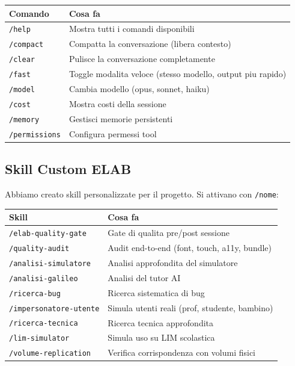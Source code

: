 \documentclass[11pt,a4paper]{article}
\begin{document}
\begin{tabularx}{\textwidth}{lX}
\toprule
\textbf{Comando} & \textbf{Cosa fa} \\
\midrule
\texttt{/help} & Mostra tutti i comandi disponibili \\
\texttt{/compact} & Compatta la conversazione (libera contesto) \\
\texttt{/clear} & Pulisce la conversazione completamente \\
\texttt{/fast} & Toggle modalita veloce (stesso modello, output piu rapido) \\
\texttt{/model} & Cambia modello (opus, sonnet, haiku) \\
\texttt{/cost} & Mostra costi della sessione \\
\texttt{/memory} & Gestisci memorie persistenti \\
\texttt{/permissions} & Configura permessi tool \\
\bottomrule
\end{tabularx}

\subsection{Skill Custom ELAB}

Abbiamo creato skill personalizzate per il progetto. Si attivano con \texttt{/nome}:

\begin{tabularx}{\textwidth}{lX}
\toprule
\textbf{Skill} & \textbf{Cosa fa} \\
\midrule
\texttt{/elab-quality-gate} & Gate di qualita pre/post sessione \\
\texttt{/quality-audit} & Audit end-to-end (font, touch, a11y, bundle) \\
\texttt{/analisi-simulatore} & Analisi approfondita del simulatore \\
\texttt{/analisi-galileo} & Analisi del tutor AI \\
\texttt{/ricerca-bug} & Ricerca sistematica di bug \\
\texttt{/impersonatore-utente} & Simula utenti reali (prof, studente, bambino) \\
\texttt{/ricerca-tecnica} & Ricerca tecnica approfondita \\
\texttt{/lim-simulator} & Simula uso su LIM scolastica \\
\texttt{/volume-replication} & Verifica corrispondenza con volumi fisici \\
\bottomrule
\end{tabularx}
\end{document}
